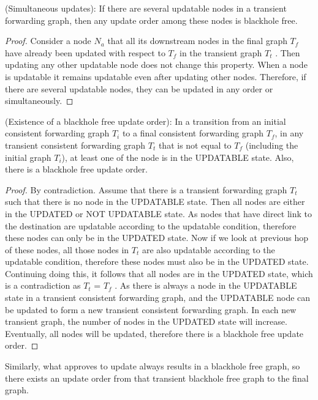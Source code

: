 \begin{theorem} (Simultaneous updates): If there are several updatable nodes in
a transient forwarding graph, then any update order among these nodes is
blackhole free.  
\end{theorem}

\begin{proof} Consider a node $N_a$ that all its downstream nodes in the final
graph $T_f$ have already been updated with respect to $T_f$ in the transient
graph $T_t$ . Then updating any other updatable node does not change this
property. When a node is updatable it remains updatable even after updating
other nodes. Therefore, if there are several updatable nodes, they can be
updated in any order or simultaneously.  
\end{proof}

\begin{theorem} (Existence of a blackhole free update order): In a transition from
an initial consistent forwarding graph $T_i$ to a final consistent forwarding
graph $T_f$, in any transient consistent forwarding graph $T_t$ that is not
equal to $T_f$ (including the initial graph $T_i$), at least one of the node is in
the UPDATABLE state. Also, there is a blackhole free update order.
\end{theorem}

\begin{proof} By contradiction. 
Assume that there is a transient forwarding graph $T_t$ such that
there is no node in the UPDATABLE state. Then all nodes are either in the
UPDATED or NOT UPDATABLE state. As nodes that have direct link to the destination are
updatable according to the updatable condition, therefore these nodes can only
be in the UPDATED state. Now if we look at previous hop of these nodes, all
those nodes in $T_t$ are also updatable according to the updatable
condition, therefore these nodes must also be in the UPDATED state. Continuing
doing this, it follows that all nodes are in the UPDATED state, which is a
contradiction as $T_t$ = $T_f$ . As there is always a node in the UPDATABLE state
in a transient consistent forwarding graph, and the UPDATABLE node can be
updated to form a new transient consistent forwarding graph. In each new
transient graph, the number of nodes in the UPDATED state will increase.
Eventually, all nodes will be updated, therefore there is a blackhole free
update order.
\end{proof}

Similarly, what \name approves to update always results in a blackhole free graph, 
so there exists an update order from that transient blackhole free graph to the final graph.

